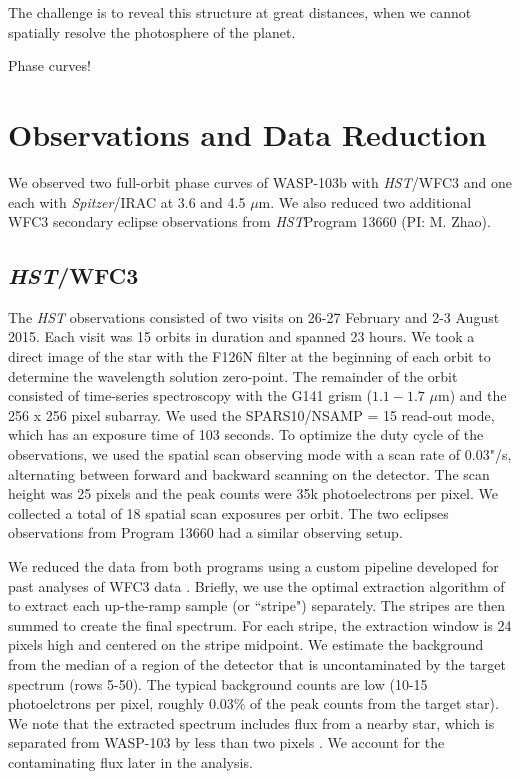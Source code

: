 \documentclass[twocolumn]{aastex61}
\newcommand{\project}[1]{\textsl{#1}}
\newcommand{\HST}{\project{HST}}
\newcommand{\Spitzer}{\project{Spitzer}}
\begin{document}
The challenge is to reveal this structure at great distances, when we cannot spatially resolve the photosphere of the planet.

Phase curves! 

\section{Observations and Data Reduction}
We observed two full-orbit phase curves of WASP-103b with \HST/WFC3 and one each with \Spitzer/IRAC at 3.6 and 4.5 $\mu$m. We also reduced two additional WFC3 secondary eclipse observations from \HST Program 13660 (PI: M. Zhao).

\subsection{\HST/WFC3}
The \emph{HST} observations consisted of two visits on 26-27 February and 2-3 August 2015. Each visit was 15 orbits in duration and spanned 23 hours. We took a direct image of the star with the F126N filter at the beginning of each orbit to determine the wavelength solution zero-point. The remainder of the orbit consisted of time-series spectroscopy with the G141 grism ($1.1 - 1.7$ $\mu$m) and the 256 x 256 pixel subarray. We used the SPARS10/NSAMP = 15 read-out mode, which has an exposure time of 103 seconds. To optimize the duty cycle of the observations, we used the spatial scan observing mode with a scan rate of 0.03"/s, alternating between forward and backward scanning on the detector. The scan height was 25 pixels and the peak counts were 35k photoelectrons per pixel. We collected a total of 18 spatial scan exposures per orbit.  The two eclipses observations from Program 13660 had a similar observing setup.  

We reduced the data from both programs using a custom pipeline developed for past analyses of WFC3 data \citep[for details see][]{kreidberg14a, kreidberg14b, kreidberg15a}. Briefly, we use the optimal extraction algorithm of \cite{horne86} to extract each up-the-ramp sample (or ``stripe") separately. The stripes are then summed to create the final spectrum. For each stripe, the extraction window is 24 pixels high and centered on the stripe midpoint. We estimate the background from the median of a region of the detector that is uncontaminated by the target spectrum (rows 5-50). The typical background counts are low (10-15 photoelctrons per pixel, roughly 0.03\% of the peak counts from the target star). We note that the extracted spectrum includes flux from a nearby star, which is separated from WASP-103 by less than two pixels \citep[0.2"][]{wollert15}. We account for the contaminating flux later in the analysis. 
\end{document}
